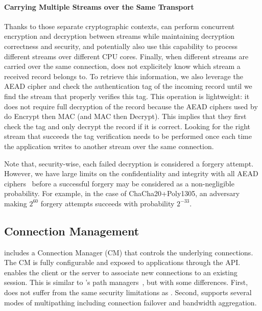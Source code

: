\paragraph*{Carrying Multiple Streams over the Same Transport}
Thanks to those separate cryptographic contexts, \tcpls can perform concurrent
encryption and decryption between streams while maintaining decryption
correctness and security, and potentially also use this capability to process
different streams over different CPU cores.
Finally, when different streams are carried
over the same \tcp connection, \tcpls does not explicitely know which stream
a received record belongs to. To retrieve this information,
we also
leverage the AEAD cipher and check the authentication tag of the incoming record
until we find the stream that properly verifies this tag. This operation is
lightweight: it does not require full decryption of the record because the AEAD
ciphers used by  do Encrypt then MAC (and MAC then Decrypt). This
implies that they first check the tag and only decrypt the record
if it is correct.
Looking for the right stream that succeeds the tag verification needs to be
performed once each time the application writes to another stream over the same
\tcp connection.

Note that, security-wise, each failed decryption is considered a
forgery attempt. However, we have large limits on the confidentiality and
integrity with all AEAD ciphers~\cite{luykx2015limits, aeadlimits} before a
successful forgery may be considered as a non-negligible probability. For
example, in the case of ChaCha20+Poly1305, an adversary making $2^{60}$ forgery
attempts succeeds with probability $2^{-33}$.

\subsection{Connection Management}\label{sec:multipath}

\tcpls includes a Connection Manager (CM) that controls the underlying \tcp
connections.
The CM is fully configurable and exposed to applications through the \tcpls API.
\tcpls enables the client or the server to associate new \tcp connections to an
existing \tcpls session. This is similar to \mptcp's path
managers~\cite{raiciu2012hard,hesmans2015smapp,hesmans2016enhanced},
but with some differences. First, \tcpls does not suffer from the same
security limitations as \mptcp. Second, \tcpls supports several modes
of multipathing including connection failover and bandwidth aggregation.


